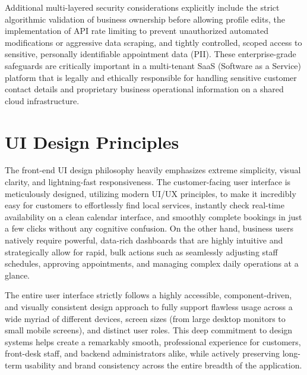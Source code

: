 Additional multi-layered security considerations explicitly include the strict algorithmic validation of business ownership before allowing profile edits, the implementation of API rate limiting to prevent unauthorized automated modifications or aggressive data scraping, and tightly controlled, scoped access to sensitive, personally identifiable appointment data (PII). These enterprise-grade safeguards are critically important in a multi-tenant SaaS (Software as a Service) platform that is legally and ethically responsible for handling sensitive customer contact details and proprietary business operational information on a shared cloud infrastructure.

\section{UI Design Principles}
The front-end UI design philosophy heavily emphasizes extreme simplicity, visual clarity, and lightning-fast responsiveness. The customer-facing user interface is meticulously designed, utilizing modern UI/UX principles, to make it incredibly easy for customers to effortlessly find local services, instantly check real-time availability on a clean calendar interface, and smoothly complete bookings in just a few clicks without any cognitive confusion. On the other hand, business users natively require powerful, data-rich dashboards that are highly intuitive and strategically allow for rapid, bulk actions such as seamlessly adjusting staff schedules, approving appointments, and managing complex daily operations at a glance.

The entire user interface strictly follows a highly accessible, component-driven, and visually consistent design approach to fully support flawless usage across a wide myriad of different devices, screen sizes (from large desktop monitors to small mobile screens), and distinct user roles. This deep commitment to design systems helps create a remarkably smooth, professional experience for customers, front-desk staff, and backend administrators alike, while actively preserving long-term usability and brand consistency across the entire breadth of the application.